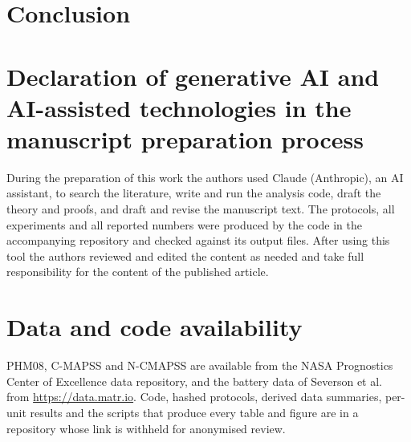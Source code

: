 \section{Conclusion}\label{sec:conclusion}



\section*{Declaration of generative AI and AI-assisted technologies in the manuscript preparation process}

\noindent During the preparation of this work the authors used Claude (Anthropic), an AI assistant, to search the literature, write and run the analysis code, draft the theory and proofs, and draft and revise the manuscript text. The protocols, all experiments and all reported numbers were produced by the code in the accompanying repository and checked against its output files. After using this tool the authors reviewed and edited the content as needed and take full responsibility for the content of the published article.

\section*{Data and code availability}

\noindent PHM08, C-MAPSS and N-CMAPSS are available from the NASA Prognostics Center of Excellence data repository, and the battery data of Severson et al.~\cite{severson2019} from \url{https://data.matr.io}. Code, hashed protocols, derived data summaries, per-unit results and the scripts that produce every table and figure are in a repository whose link is withheld for anonymised review.

